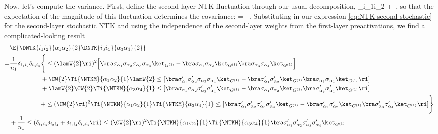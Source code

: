 Now, let's compute the variance.
First, define the second-layer NTK fluctuation through our usual decomposition,
\be
{}\equiv \delta_{i_1i_2} +\, ,
\ee
so that the expectation of the magnitude of this fluctuation determines the covariance:
 \be
{}=-\, .
\ee
Substituting in our expression \eqref{eq:NTK-second-stochastic} for the second-layer stochastic NTK and using the independence of the second-layer weights from the first-layer preactivations, we find a complicated-looking result
\begin{align}\label{eq:second-layer-ntk-pre-omega}
&\E{\DNTK{i_1i_2}{\alpha_1\alpha_2}{2}\DNTK{i_3i_4}{\alpha_3\alpha_4}{2}}\, \\
=&\frac{1}{n_1}\delta_{i_1i_2}\delta_{i_3i_4}\Bigg\{\le(\lamW{2}\ri)^2\Big[\bra\sigma_{\alpha_1}\sigma_{\alpha_2}\sigma_{\alpha_3}\sigma_{\alpha_4}\ket_{G^{(1)}}-\bra\sigma_{\alpha_1}\sigma_{\alpha_2}\ket_{G^{(1)}}\bra\sigma_{\alpha_3}\sigma_{\alpha_4}\ket_{G^{(1)}}\Big]\, \nonumber\\
&\quad \quad \quad \quad \quad +\CW{2}\Ti{\NTKM}{\alpha_1\alpha_2}{1}\lamW{2}\le[\bra\sigma^{\prime}_{\alpha_1}\sigma^{\prime}_{\alpha_2}\sigma_{\alpha_3}\sigma_{\alpha_4}\ket_{G^{(1)}}-\bra\sigma^{\prime}_{\alpha_1}\sigma^{\prime}_{\alpha_2}\ket_{G^{(1)}}\bra\sigma_{\alpha_3}\sigma_{\alpha_4}\ket_{G^{(1)}}\ri]\, \nonumber\\
&\quad \quad \quad \quad \quad +\lamW{2}\CW{2}\Ti{\NTKM}{\alpha_3\alpha_4}{1}\le[\bra\sigma_{\alpha_1}\sigma_{\alpha_2}\sigma^{\prime}_{\alpha_3}\sigma^{\prime}_{\alpha_4}\ket_{G^{(1)}}-\bra\sigma_{\alpha_1}\sigma_{\alpha_2}\ket_{G^{(1)}}\bra\sigma^{\prime}_{\alpha_3}\sigma^{\prime}_{\alpha_4}\ket_{G^{(1)}}\ri]\, \nonumber\\
&\quad \quad \quad \quad \quad +\le(\CW{2}\ri)^2\Ti{\NTKM}{\alpha_1\alpha_2}{1}\Ti{\NTKM}{\alpha_3\alpha_4}{1}\le[\bra\sigma^{\prime}_{\alpha_1}\sigma^{\prime}_{\alpha_2}\sigma^{\prime}_{\alpha_3}\sigma^{\prime}_{\alpha_4}\ket_{G^{(1)}}-\bra\sigma^{\prime}_{\alpha_1}\sigma^{\prime}_{\alpha_2}\ket_{G^{(1)}}\bra\sigma^{\prime}_{\alpha_3}\sigma^{\prime}_{\alpha_4}\ket_{G^{(1)}}\ri]\Bigg\}\, \nonumber\\
&+\frac{1}{n_1}\le(\delta_{i_1i_3}\delta_{i_2i_4}+\delta_{i_1i_4}\delta_{i_2i_3}\ri)\le(\CW{2}\ri)^2\Ti{\NTKM}{\alpha_1\alpha_2}{1}\Ti{\NTKM}{\alpha_3\alpha_4}{1}\bra\sigma^{\prime}_{\alpha_1}\sigma^{\prime}_{\alpha_2}\sigma^{\prime}_{\alpha_3}\sigma^{\prime}_{\alpha_4}\ket_{G^{(1)}}\, .\nonumber
\end{align}
